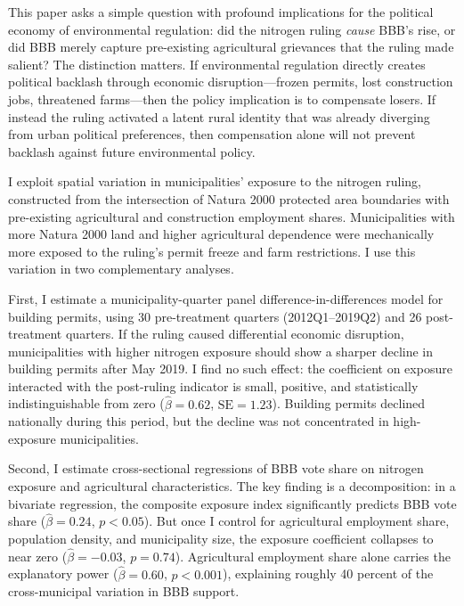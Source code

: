 \documentclass[12pt]{article}
\begin{document}
This paper asks a simple question with profound implications for the political economy of environmental regulation: did the nitrogen ruling \textit{cause} BBB's rise, or did BBB merely capture pre-existing agricultural grievances that the ruling made salient? The distinction matters. If environmental regulation directly creates political backlash through economic disruption---frozen permits, lost construction jobs, threatened farms---then the policy implication is to compensate losers. If instead the ruling activated a latent rural identity that was already diverging from urban political preferences, then compensation alone will not prevent backlash against future environmental policy.

I exploit spatial variation in municipalities' exposure to the nitrogen ruling, constructed from the intersection of Natura 2000 protected area boundaries with pre-existing agricultural and construction employment shares. Municipalities with more Natura 2000 land and higher agricultural dependence were mechanically more exposed to the ruling's permit freeze and farm restrictions. I use this variation in two complementary analyses.

First, I estimate a municipality-quarter panel difference-in-differences model for building permits, using 30 pre-treatment quarters (2012Q1--2019Q2) and 26 post-treatment quarters. If the ruling caused differential economic disruption, municipalities with higher nitrogen exposure should show a sharper decline in building permits after May 2019. I find no such effect: the coefficient on exposure interacted with the post-ruling indicator is small, positive, and statistically indistinguishable from zero ($ \hat{\beta} = 0.62$, $\text{SE} = 1.23$). Building permits declined nationally during this period, but the decline was not concentrated in high-exposure municipalities.

Second, I estimate cross-sectional regressions of BBB vote share on nitrogen exposure and agricultural characteristics. The key finding is a decomposition: in a bivariate regression, the composite exposure index significantly predicts BBB vote share ($ \hat{\beta} = 0.24$, $ p < 0.05$). But once I control for agricultural employment share, population density, and municipality size, the exposure coefficient collapses to near zero ($\hat{\beta} = -0.03$, $p = 0.74$). Agricultural employment share alone carries the explanatory power ($\hat{\beta} = 0.60$, $p < 0.001$), explaining roughly 40 percent of the cross-municipal variation in BBB support.
\end{document}
